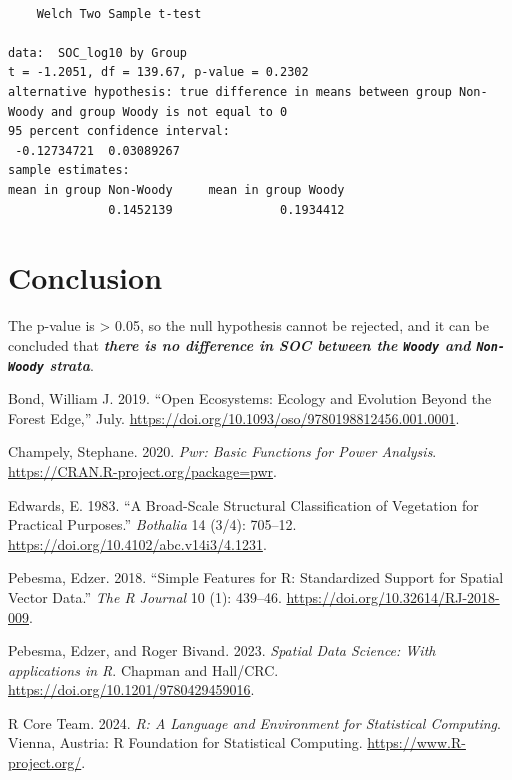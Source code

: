 \documentclass[
  letterpaper,
  DIV=11,
  numbers=noendperiod]{scrartcl}
\newlength{\cslhangindent}
\newenvironment{CSLReferences}[2] %
 {\begin{list}{}{%
  \setlength{\itemindent}{0pt}
  \setlength{\leftmargin}{0pt}
  \setlength{\parsep}{0pt}
  \ifodd #1
   \setlength{\leftmargin}{\cslhangindent}
   \setlength{\itemindent}{-1\cslhangindent}
  \fi
  \setlength{\itemsep}{#2\baselineskip}}}
 {\end{list}}
\begin{document}
\begin{verbatim}

    Welch Two Sample t-test

data:  SOC_log10 by Group
t = -1.2051, df = 139.67, p-value = 0.2302
alternative hypothesis: true difference in means between group Non-Woody and group Woody is not equal to 0
95 percent confidence interval:
 -0.12734721  0.03089267
sample estimates:
mean in group Non-Woody     mean in group Woody 
              0.1452139               0.1934412 
\end{verbatim}

\section{Conclusion}\label{conclusion}

The p-value is \textgreater{} 0.05, so the null hypothesis cannot be
rejected, and it can be concluded that \textbf{\emph{there is no
difference in SOC between the \texttt{Woody} and \texttt{Non-Woody}
strata}}.

\label{refs}
\begin{CSLReferences}{1}{0}
Bond, William J. 2019. {``Open Ecosystems: Ecology and Evolution Beyond
the Forest Edge,''} July.
\url{https://doi.org/10.1093/oso/9780198812456.001.0001}.

Champely, Stephane. 2020. \emph{Pwr: Basic Functions for Power
Analysis}. \url{https://CRAN.R-project.org/package=pwr}.

Edwards, E. 1983. {``A Broad-Scale Structural Classification of
Vegetation for Practical Purposes.''} \emph{Bothalia} 14 (3/4): 705--12.
\url{https://doi.org/10.4102/abc.v14i3/4.1231}.

Pebesma, Edzer. 2018. {``{Simple Features for R: Standardized Support
for Spatial Vector Data}.''} \emph{{The R Journal}} 10 (1): 439--46.
\url{https://doi.org/10.32614/RJ-2018-009}.

Pebesma, Edzer, and Roger Bivand. 2023. \emph{{Spatial Data Science:
With applications in R}}. {Chapman and Hall/CRC}.
\url{https://doi.org/10.1201/9780429459016}.

R Core Team. 2024. \emph{R: A Language and Environment for Statistical
Computing}. Vienna, Austria: R Foundation for Statistical Computing.
\url{https://www.R-project.org/}.

\end{CSLReferences}
\end{document}
